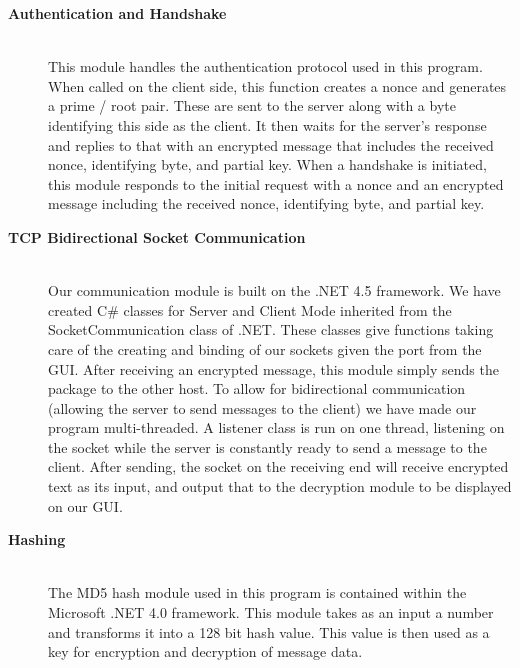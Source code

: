 \documentclass[journal]{IEEEtran}
\begin{document}
\begin{description}
	
	\item[\bfseries Authentication and Handshake] \hfill \\
	This module handles the authentication protocol used in this program. When called on the client side, this function creates a nonce and generates a prime / root pair. These are sent to the server along with a byte identifying this side as the client. It then waits for the server's response and replies to that with an encrypted message that includes the received nonce, identifying byte, and partial key. When a handshake is initiated, this module responds to the initial request with a nonce and an encrypted message including the received nonce, identifying byte, and partial key.
	
	\item[\bfseries TCP Bidirectional Socket Communication] \hfill \\
	Our communication module is built on the .NET 4.5 framework. We have created C\# classes for Server and Client Mode inherited from the SocketCommunication class of .NET. These classes give functions taking care of the creating and binding of our sockets given the port from the GUI. After receiving an encrypted message, this module simply sends the package to the other host. To allow for bidirectional communication (allowing the server to send messages to the client) we have made our program multi-threaded. A listener class is run on one thread, listening on the socket while the server is constantly ready to send a message to the client. After sending, the socket on the receiving end will receive encrypted text as its input, and output that to the decryption module to be displayed on our GUI.
	
	\item[\bfseries Hashing] \hfill \\
	The MD5 hash module used in this program is contained within the Microsoft .NET 4.0 framework. This module takes as an input a number and transforms it into a 128 bit hash value. This value is then used as a key for encryption and decryption of message data.
\end{description}
\end{document}
